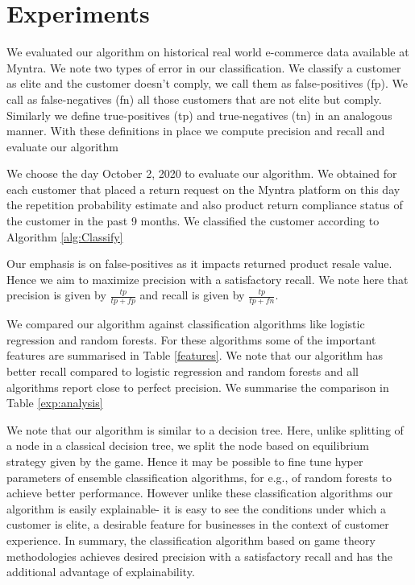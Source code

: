 \section{Experiments}
We evaluated our algorithm on historical real world e-commerce data available at Myntra. We note two types of error in our classification. We classify a customer as elite and the customer doesn't comply, we call them as false-positives (fp). We call as false-negatives (fn) all those customers that are not elite but comply. Similarly we define true-positives (tp) and true-negatives (tn) in an analogous manner. With these definitions in place we compute precision and recall and evaluate our algorithm

We choose the day October 2, 2020 to evaluate our algorithm. We obtained for each customer that placed a return request on the Myntra platform on this day the repetition probability estimate and also product return compliance status of the customer in the past 9 months. We classified the customer according to Algorithm \ref{alg:Classify}

Our emphasis is on false-positives as it impacts returned product resale value. Hence we aim to maximize precision with a satisfactory recall. We note here that precision is given by $\frac{tp}{tp+fp}$ and recall is given by $\frac{tp}{tp+fn}$.

We compared our algorithm against classification algorithms like logistic regression and random forests. For these algorithms some of the important features are summarised in Table \ref{features}. We note that our algorithm has better recall compared to logistic regression and random forests and all algorithms report close to perfect precision. We summarise the comparison in Table \ref{exp:analysis}

We note that our algorithm is similar to a decision tree. Here, unlike splitting of a node in a classical decision tree, we split the node based on equilibrium strategy given by the game. Hence it may be possible to fine tune hyper parameters of ensemble classification algorithms, for e.g., of random forests to achieve better performance. However unlike these classification algorithms our algorithm is easily explainable- it is easy to see the conditions under which a customer is elite, a desirable feature for businesses in the context of customer experience. In summary, the classification algorithm based on game theory methodologies achieves desired precision with a satisfactory recall and has the additional advantage of explainability.

